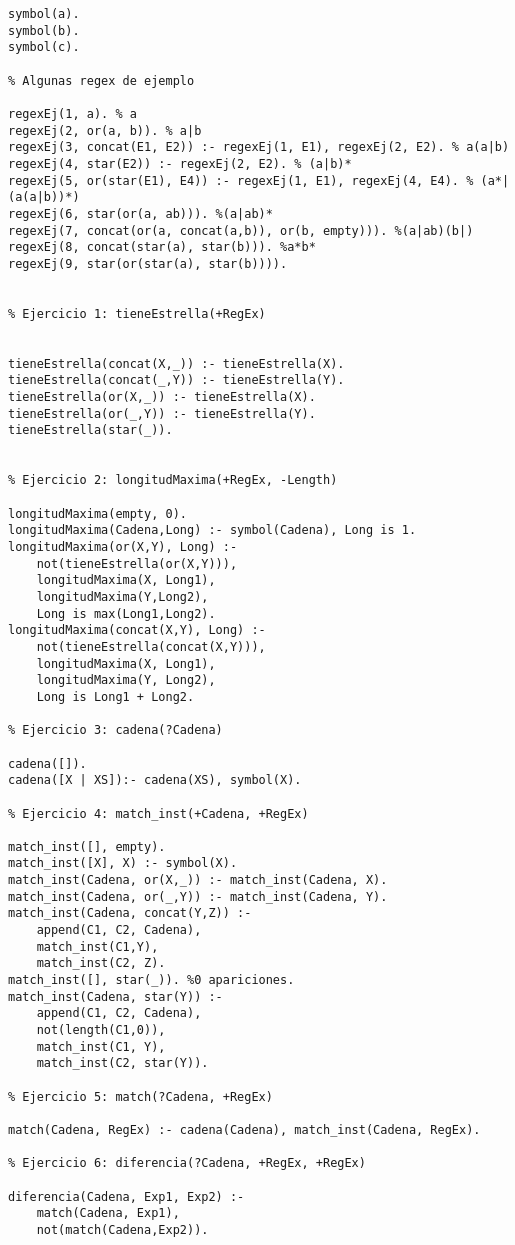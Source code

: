 
\begin{verbatim}
symbol(a).
symbol(b).
symbol(c).

% Algunas regex de ejemplo

regexEj(1, a). % a
regexEj(2, or(a, b)). % a|b
regexEj(3, concat(E1, E2)) :- regexEj(1, E1), regexEj(2, E2). % a(a|b)
regexEj(4, star(E2)) :- regexEj(2, E2). % (a|b)*
regexEj(5, or(star(E1), E4)) :- regexEj(1, E1), regexEj(4, E4). % (a*|(a(a|b))*)
regexEj(6, star(or(a, ab))). %(a|ab)*
regexEj(7, concat(or(a, concat(a,b)), or(b, empty))). %(a|ab)(b|)
regexEj(8, concat(star(a), star(b))). %a*b*
regexEj(9, star(or(star(a), star(b)))).


% Ejercicio 1: tieneEstrella(+RegEx)


tieneEstrella(concat(X,_)) :- tieneEstrella(X).
tieneEstrella(concat(_,Y)) :- tieneEstrella(Y).
tieneEstrella(or(X,_)) :- tieneEstrella(X).
tieneEstrella(or(_,Y)) :- tieneEstrella(Y).
tieneEstrella(star(_)).


% Ejercicio 2: longitudMaxima(+RegEx, -Length)

longitudMaxima(empty, 0).
longitudMaxima(Cadena,Long) :- symbol(Cadena), Long is 1.
longitudMaxima(or(X,Y), Long) :- 
    not(tieneEstrella(or(X,Y))), 
    longitudMaxima(X, Long1), 
    longitudMaxima(Y,Long2), 
    Long is max(Long1,Long2).
longitudMaxima(concat(X,Y), Long) :- 
    not(tieneEstrella(concat(X,Y))), 
    longitudMaxima(X, Long1), 
    longitudMaxima(Y, Long2), 
    Long is Long1 + Long2.

% Ejercicio 3: cadena(?Cadena)

cadena([]).
cadena([X | XS]):- cadena(XS), symbol(X).

% Ejercicio 4: match_inst(+Cadena, +RegEx)

match_inst([], empty).
match_inst([X], X) :- symbol(X).
match_inst(Cadena, or(X,_)) :- match_inst(Cadena, X).
match_inst(Cadena, or(_,Y)) :- match_inst(Cadena, Y).
match_inst(Cadena, concat(Y,Z)) :- 
    append(C1, C2, Cadena), 
    match_inst(C1,Y), 
    match_inst(C2, Z).
match_inst([], star(_)). %0 apariciones.
match_inst(Cadena, star(Y)) :- 
    append(C1, C2, Cadena), 
    not(length(C1,0)), 
    match_inst(C1, Y), 
    match_inst(C2, star(Y)).

% Ejercicio 5: match(?Cadena, +RegEx)

match(Cadena, RegEx) :- cadena(Cadena), match_inst(Cadena, RegEx).

% Ejercicio 6: diferencia(?Cadena, +RegEx, +RegEx)

diferencia(Cadena, Exp1, Exp2) :-
    match(Cadena, Exp1), 
    not(match(Cadena,Exp2)).


\end{verbatim}
